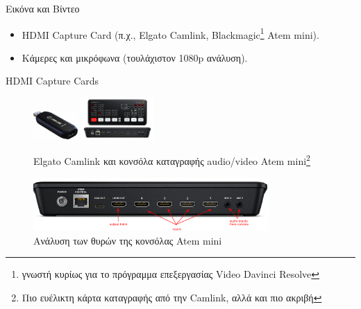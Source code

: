 \documentclass[aspectratio=169]{beamer}
\begin{document}
\begin{frame}[allowframebreaks]{Εικόνα και Βίντεο}

  \begin{itemize}
    \item HDMI Capture Card (π.χ., Elgato Camlink, Blackmagic\footnote{γνωστή κυρίως για το πρόγραμμα επεξεργασίας Video Davinci Resolve} Atem mini).
    \item Κάμερες και μικρόφωνα (τουλάχιστον 1080p ανάλυση).
  \end{itemize}
  \begin{block}{HDMI Capture Cards}
    \begin{figure}
      \centering
      \includegraphics[width=0.15\textwidth]{images/elgato.jpeg}
      \includegraphics[width=0.25\textwidth]{images/atem.jpg}
      \caption{Elgato Camlink και κονσόλα καταγραφής audio/video Atem mini\footnote{Πιο ευέλικτη κάρτα καταγραφής από την Camlink, αλλά και πιο ακριβή}}
    \end{figure}
  \end{block}
  \begin{figure}
    \centering
    \includegraphics[width=0.8\textwidth]{images/atem_explanation.png}
    \caption{Ανάλυση των θυρών της κονσόλας Atem mini}
  \end{figure}
\end{frame}
\end{document}

